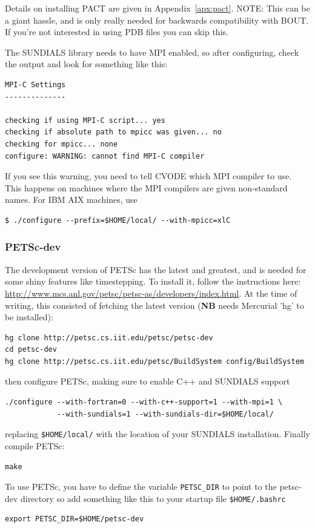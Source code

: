 \documentclass[12pt]{article}
\begin{document}
Details on installing PACT are given in Appendix~\ref{apx:pact}. NOTE: This
can be a giant hassle, and is only really needed
for backwards compatibility with BOUT. If you're not interested in using PDB files
you can skip this.

The SUNDIALS library needs to have MPI enabled, so after configuring, check the output and look for something like this:
\begin{verbatim}
MPI-C Settings
--------------

checking if using MPI-C script... yes
checking if absolute path to mpicc was given... no
checking for mpicc... none
configure: WARNING: cannot find MPI-C compiler
\end{verbatim}

If you see this warning, you need to tell CVODE which MPI compiler to use. This happens
on machines where the MPI compilers are given non-standard names. For IBM AIX machines,
use
\begin{verbatim}
$ ./configure --prefix=$HOME/local/ --with-mpicc=xlC
\end{verbatim}

\subsubsection{PETSc-dev}

The development version of PETSc has the latest and greatest, and is needed for some 
shiny features like timestepping. To install it, follow the instructions here:
\url{http://www.mcs.anl.gov/petsc/petsc-as/developers/index.html}. At the time of
writing, this consisted of fetching the latest version ({\bf NB} needs Mercurial 
'hg' to be installed):
\begin{verbatim}
hg clone http://petsc.cs.iit.edu/petsc/petsc-dev
cd petsc-dev
hg clone http://petsc.cs.iit.edu/petsc/BuildSystem config/BuildSystem
\end{verbatim}

then configure PETSc, making sure to enable C++ and SUNDIALS support
\begin{verbatim}
./configure --with-fortran=0 --with-c++-support=1 --with-mpi=1 \
            --with-sundials=1 --with-sundials-dir=$HOME/local/
\end{verbatim}
replacing \texttt{\$HOME/local/} with the location of your SUNDIALS installation. Finally
compile PETSc:
\begin{verbatim}
make
\end{verbatim}
To use PETSc, you have to define the variable \texttt{PETSC\_DIR} to point to the petsc-dev directory so add something
like this to your startup file \texttt{\$HOME/.bashrc}
\begin{verbatim}
export PETSC_DIR=$HOME/petsc-dev
\end{verbatim}
\end{document}
